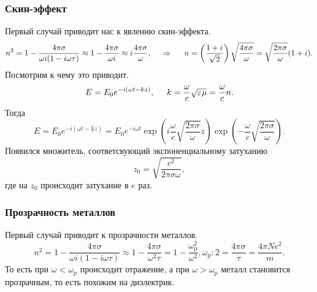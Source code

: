 \subsubsection*{Скин-эффект}


Первый случай приводит нас к явлению скин-эффекта.
\begin{equation*}
    n^2 = 1 - \frac{4\pi\sigma}{\omega i (1 -i \omega \tau)} 
    \approx
    1 - \frac{4\pi \sigma}{\omega i} \approx i \frac{4 \pi \sigma}{\omega},
    \hspace{0.5cm} \Rightarrow \hspace{0.5cm} 
    n = \left(\frac{1 + i}{\sqrt{2}}\right) \sqrt{\frac{4\pi\sigma}{\omega}}
    = \sqrt{\frac{2\pi\sigma}{\omega} } (1 + i)
    .
\end{equation*}
Посмотрим к чему это приводит. 
\begin{equation*}
    E = E_0 e^{-i(\omega t - kz)}, \hspace{0.5cm} 
    k = \frac{\omega}{c} \sqrt{\varepsilon \mu} = \frac{\omega}{c} n.
\end{equation*}
Тогда
\begin{equation*}
    E = E_0 e^{-i(\omega t - \frac{n}{c} z)} = E_0
    e^{-i \omega t} \exp\left(
        i \frac{\omega}{c} \sqrt{\frac{2\pi\sigma}{\omega} }z
    \right)
    \exp\left(
        - \frac{\omega}{c} \sqrt{\frac{2\pi\sigma}{\omega} }
    \right).
\end{equation*}
Появился множитель, соответсвующий экспоненциальному затуханию
\begin{equation*}
    z_0 = \sqrt{\frac{c^2}{2\pi \sigma \omega} },
\end{equation*}
где на $z_0$ происходит затухание в $e$ раз. 


\subsubsection*{Прозрачность металлов}

Первый случай приводит к прозрачности металлов.
\begin{equation*}
    n^2 = 1 - \frac{4\pi\sigma}{\omega i (1 -i \omega \tau)} 
    \approx
    1 - \frac{4\pi\sigma}{\omega^2 \tau} = 1 - \frac{\omega_{\text{p}}^2}{\omega^2} 
    ,
    \omega_{\text{p}}:2 = 
    \frac{4 \pi \sigma}{\tau} = \frac{4 \pi N e^2}{m}.
\end{equation*}
То есть при $\omega < \omega_{\text{p}}$ происходит отражение, а при $\omega > \omega_{\text{p}}$ металл становится прозрачным, то есть похожим на диэлектрик. 











